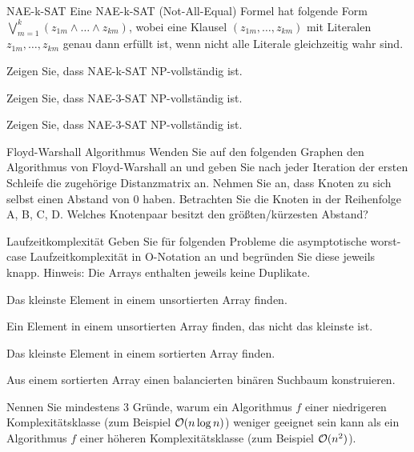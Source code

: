 \documentclass{exercisesheet}
\begin{document}
\begin{eexercises}{NAE-k-SAT}{
    Eine NAE-k-SAT (Not-All-Equal) Formel hat folgende Form $\bigvee_{m=1}^k (z_{1m} \land \ldots \land z_{km})$, wobei eine Klausel $(z_{1m}, \ldots, z_{km})$ mit Literalen $z_{1m}, \ldots, z_{km}$ genau dann erfüllt ist, wenn nicht alle Literale gleichzeitig wahr sind.
  }
  \item Zeigen Sie, dass NAE-k-SAT NP-vollständig ist.
  \item Zeigen Sie, dass NAE-3-SAT NP-vollständig ist.
  \item Zeigen Sie, dass NAE-3-SAT NP-vollständig ist.
\end{eexercises}

\begin{exercise}{Floyd-Warshall Algorithmus}
  Wenden Sie auf den folgenden Graphen den Algorithmus von Floyd-Warshall an und geben Sie nach jeder Iteration der ersten Schleife die zugehörige Distanzmatrix an. Nehmen Sie an, dass Knoten zu sich selbst einen Abstand von 0 haben. Betrachten Sie die Knoten in der Reihenfolge A, B, C, D. Welches Knotenpaar besitzt den größten/kürzesten Abstand?
\end{exercise}



\begin{eexercises}{Laufzeitkomplexität}{
    Geben Sie für folgenden Probleme die asymptotische worst-case Laufzeitkomplexität in O-Notation an und begründen Sie diese jeweils knapp. Hinweis: Die Arrays enthalten jeweils keine Duplikate.
  }
  \item Das kleinste Element in einem unsortierten Array finden.
  \item Ein Element in einem unsortierten Array finden, das nicht das kleinste ist.
  \item Das kleinste Element in einem sortierten Array finden.
  \item Aus einem sortierten Array einen balancierten binären Suchbaum konstruieren.
  \item Nennen Sie mindestens 3 Gründe, warum ein Algorithmus $f$ einer niedrigeren Komplexitätsklasse (zum Beispiel $\mathcal{O}(n \log n)$) weniger geeignet sein kann als ein Algorithmus $f$ einer höheren Komplexitätsklasse (zum Beispiel $\mathcal{O}(n^2)$).
\end{eexercises}
\end{document}
